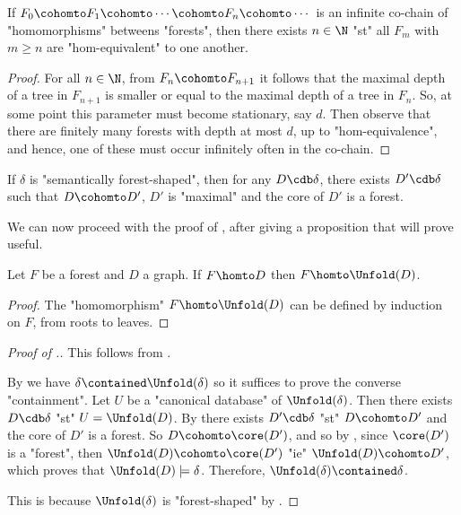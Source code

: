 \begin{fact}
	If $F_0 \cohomto F_1 \cohomto \cdots \cohomto F_n \cohomto \cdots$
	is an infinite co-chain of "homomorphisms" betweens "forests", 
	then there exists $n \in \N$ "st" all $F_m$ with $m\geq n$
	are "hom-equivalent" to one another.
\end{fact}

\begin{proof}
	For all $n \in \N$, from $F_n \cohomto F_{n+1}$ it follows that
	the maximal depth of a tree in $F_{n+1}$ is smaller or equal to the
	maximal depth of a tree in $F_{n}$. So, at some point this parameter
	must become stationary, say $d$. Then observe that there
	are finitely many forests with depth at most $d$, up to "hom-equivalence",
	and hence, one of these must occur infinitely often in the co-chain.
\end{proof}

\begin{corollary}
	\AP\label{coro:all-cdb-are-dominated-by-forests}
	If $\delta$ is "semantically forest-shaped", then for any
	$D \cdb \delta$, there exists $D' \cdb \delta$ such that
	$D \cohomto D'$, $D'$ is "maximal" and the core of $D'$ is a forest.
\end{corollary}

We can now proceed with the proof of , after giving a
proposition that will prove useful.

\begin{proposition}
	\AP\label{prop:hom-from-forest}
	Let $F$ be a forest and $D$ a graph. If $F \homto D$ then $F \homto \Unfold(D)$.
\end{proposition}

\begin{proof}
	The "homomorphism" $F \homto \Unfold(D)$ can be defined by induction on $F$, from roots
	to leaves.
\end{proof}

\begin{proof}[Proof of .]
	 This follows from
	.

	 By  we have $\delta \contained \Unfold(\delta)$ so it suffices to prove the converse "containment".
	Let $U$ be a "canonical database" of $\Unfold(\delta)$. Then there exists $D \cdb \delta$
	"st" $U = \Unfold(D)$. By  there exists
	$D' \cdb \delta$ "st" $D \cohomto D'$ and the core of $D'$ is a forest. So $D \cohomto \core(D')$, and so by , since $\core(D')$ is a "forest",
	then $\Unfold(D) \cohomto \core(D')$ "ie" $\Unfold(D) \cohomto D'$, which proves
	that $\Unfold(D) \models \delta$. Therefore, $\Unfold(\delta) \contained \delta$.

	 This is because $\Unfold(\delta)$ is "forest-shaped"
		by .
\end{proof}